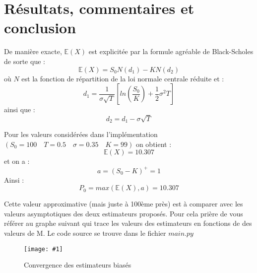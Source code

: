 \documentclass[12pt,french]{article}
\newcommand{\IMG}[3]{
\begin{figure}[H]
\texttt{[image: \#1]}%
\caption{#2}%
\label{#1}%
\end{figure}

}
\begin{document}
\section{Résultats, commentaires et conclusion}
De manière exacte, $\mathbb{E}(X)$ est explicitée par la formule agréable de Black-Scholes de sorte que :
$$
	\mathbb{E}(X) = S_0 N(d_1) - K N(d_2)
$$
où $N$ est la fonction de répartition de la loi normale centrale réduite et :
$$
	d_1 = \frac{1}{\sigma \sqrt{T}} \left[ ln(\frac{S_0}{K})+\frac{1}{2}\sigma^2 T \right]
$$
ainsi que :
$$
	d_2 = d_1 - \sigma \sqrt{T}
$$

Pour les valeurs considérées dans l'implémentation $\left( S_0=100 \quad T=0.5 \quad \sigma = 0.35 \quad K=99 \right)$ on obtient  :
$$
	\mathbb{E}(X) = 10.307
$$
et on a :
$$
	a = (S_0-K)^+ = 1
$$
Ainsi :
$$
	P_0 = max(	\mathbb{E}(X),a ) = 10.307
$$

Cette valeur approximative (mais juste à 100ème près) est à comparer avec les valeurs asymptotiques des deux estimateurs proposés. Pour cela prière de vous référer au graphe suivant qui trace les valeurs des estimateurs en fonctions de des valeurs de M.
Le code source se trouve dans le fichier $main.py$

\IMG{figure.png}{Convergence des estimateurs biasés}{0.5}
\end{document}
